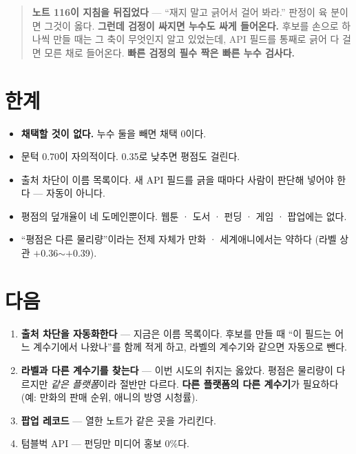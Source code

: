 \documentclass[10pt]{article}
\begin{document}
\begin{quote}\fontsize{9.5}{11.5}\selectfont
\textbf{노트 116이 지침을 뒤집었다} --- ``재지 말고 긁어서 걸어 봐라.''
판정이 육 분이면 그것이 옳다. \textbf{그런데 검정이 싸지면 누수도 싸게
들어온다.} 후보를 손으로 하나씩 만들 때는 그 축이 무엇인지 알고 있었는데,
API 필드를 통째로 긁어 다 걸면 모른 채로 들어온다. \textbf{빠른 검정의
필수 짝은 빠른 누수 검사다.}
\end{quote}

\section{한계}

\begin{itemize}[leftmargin=1.1em,itemsep=0.15em]
\item \textbf{채택할 것이 없다.} 누수 둘을 빼면 채택 0이다.
\item 문턱 0.70이 자의적이다. 0.35로 낮추면 평점도 걸린다.
\item 출처 차단이 이름 목록이다. 새 API 필드를 긁을 때마다 사람이 판단해
      넣어야 한다 --- 자동이 아니다.
\item 평점의 덮개율이 네 도메인뿐이다. 웹툰 · 도서 · 펀딩 · 게임 · 팝업에는
      없다.
\item ``평점은 다른 물리량''이라는 전제 자체가 만화 · 세계애니에서는 약하다
      (라벨 상관 $+$0.36$\sim+$0.39).
\end{itemize}

\section{다음}

\begin{enumerate}[leftmargin=1.3em,itemsep=0.15em]
\item \textbf{출처 차단을 자동화한다} --- 지금은 이름 목록이다. 후보를 만들
      때 ``이 필드는 어느 계수기에서 나왔나''를 함께 적게 하고, 라벨의
      계수기와 같으면 자동으로 뺀다.
\item \textbf{라벨과 다른 계수기를 찾는다} --- 이번 시도의 취지는 옳았다.
      평점은 물리량이 다르지만 \emph{같은 플랫폼}이라 절반만 다르다.
      \textbf{다른 플랫폼의 다른 계수기}가 필요하다(예: 만화의 판매 순위,
      애니의 방영 시청률).
\item \textbf{팝업 레코드} --- 열한 노트가 같은 곳을 가리킨다.
\item 텀블벅 API --- 펀딩만 미디어 홍보 0\%다.
\end{enumerate}
\end{document}
